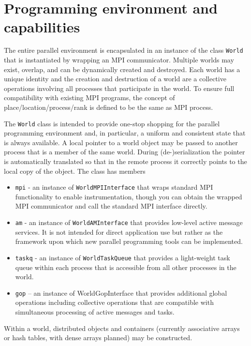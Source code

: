 \documentclass[letterpaper]{article}
\newcommand\liststyleLv{%
\renewcommand\labelitemi{${\bullet}$}
\renewcommand\labelitemii{${\circ}$}
\renewcommand\labelitemiii{${\blacksquare}$}
\renewcommand\labelitemiv{${\bullet}$}
}
\begin{document}
\section{Programming environment and capabilities}
The entire parallel environment is encapsulated in an instance of the class \texttt{World} that is instantiated by
wrapping an MPI communicator. Multiple worlds may exist, overlap, and can be dynamically created and destroyed. Each
world has a unique identity and the creation and destruction of a world are a collective operations involving all
processes that participate in the world. To ensure full compatibility with existing MPI programs, the concept of
place/location/process/rank is defined to be the same as MPI process.

The \texttt{World} class is intended to provide one-stop shopping for the parallel programming environment and, in
particular, a uniform and consistent state that is always available. A local pointer to a world object may be passed to
another process that is a member of the same world. During (de-)serialization the pointer is automatically translated
so that in the remote process it correctly points to the local copy of the object. The class has members

\liststyleLv
\begin{itemize}
\item \texttt{mpi} - an instance of \texttt{WorldMPIInterface} that wraps standard MPI functionality to enable
instrumentation, though you can obtain the wrapped MPI communicator and call the standard MPI interface directly.
\item \texttt{am} - an instance of \texttt{WorldAMInterface} that provides low-level active message services. It is not
intended for direct application use but rather as the framework upon which new parallel programming tools can be
implemented.
\item \texttt{taskq} - an instance of \texttt{WorldTaskQueue} that provides a light-weight task queue within each
process that is accessible from all other processes in the world.
\item \texttt{gop} -- an instance of WorldGopInterface that provides additional global operations including collective
operations that are compatible with simultaneous processing of active messages and tasks.
\end{itemize}
Within a world, distributed objects and containers (currently associative arrays or hash tables, with dense arrays
planned) may be constructed.
\end{document}
